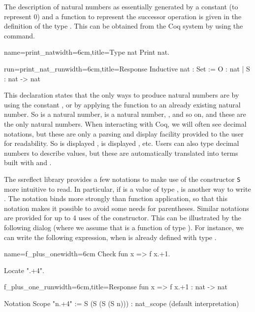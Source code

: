 The description of natural numbers as essentially generated by a
constant  (to represent 0) and a function  to represent 
the successor operation is given in the definition of the type
. This can
be obtained from the Coq system by using the  command.

\begin{coq}{name=print_nat}{width=6cm,title=Type nat}
Print nat.

\end{coq}
\begin{coqout}{run=print_nat_run}{width=6cm,title=Response}
Inductive nat : Set :=  O : nat | S : nat -> nat
\end{coqout}

This declaration states that the only ways to produce natural numbers
are by using the constant , or by applying the function  to
an already existing natural number.  So  is a natural number,  is a
natural number, , and so on, and these are the only natural
numbers.  When interacting with Coq, we will often see decimal
notations, but these are only a parsing and display
facility provided to the user for readability.  So  is displayed
,  is displayed , etc.  Users can also type decimal
numbers to describe values, but these are automatically translated into
terms built with  and .

The ssreflect library provides a few notations to make use of the
constructor {\tt S} more intuitive to read.  In particular, if 
is a value of type ,  is another way to write .  The  notation binds more strongly than function
application, so that this notation makes it possible to avoid some
needs for parentheses.
Similar notations are provided for up to 4 uses of the 
constructor.  This can be illustrated by the following dialog (where
we assume that  is a function of type ).
  For instance, we can write the following
expression, when  is already defined with type .

\begin{coq}{name=f_plus_one}{width=6cm}
Check fun x => f x.+1.

Locate ".+4".
$~$
$~$
$~$
\end{coq}
\begin{coqout}{f_plus_one_run}{width=6cm,title=Response}
fun x => f x.+1 : nat -> nat

Notation        Scope
"n.+4" := S (S (S (S n)))  : nat_scope
    (default interpretation)
\end{coqout}

